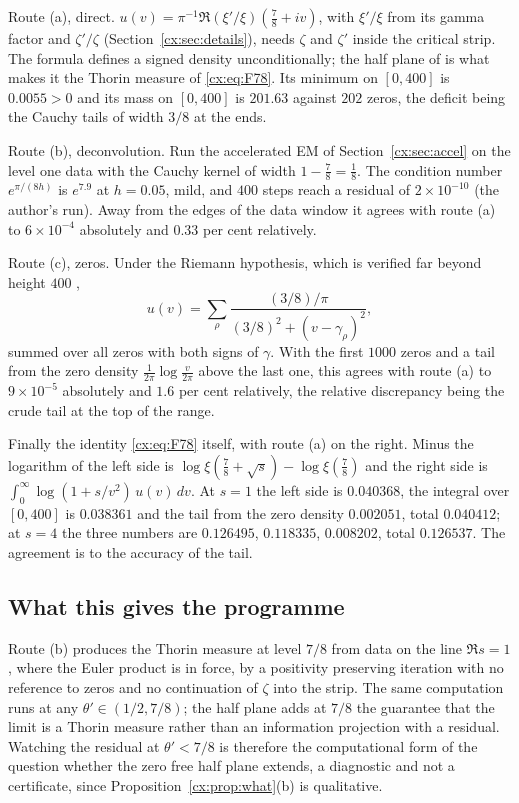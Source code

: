 Route (a), direct. $u(v)=\pi^{-1}\Re(\xi'/\xi)(\tfrac78+iv)$, with $\xi'/\xi$ from its gamma factor and $\zeta'/\zeta$ (Section~\ref{cx:sec:details}), needs $\zeta$ and $\zeta'$ inside the critical strip. The formula defines a signed density unconditionally; the half plane of \cite{OAI26a} is what makes it the Thorin measure of \eqref{cx:eq:F78}. Its minimum on $[0,400]$ is $0.0055>0$ and its mass on $[0,400]$ is $201.63$ against $202$ zeros, the deficit being the Cauchy tails of width $3/8$ at the ends.

Route (b), deconvolution. Run the accelerated EM of Section~\ref{cx:sec:accel} on the level one data with the Cauchy kernel of width $1-\tfrac78=\tfrac18$. The condition number $e^{\pi/(8h)}$ is $e^{7.9}$ at $h=0.05$, mild, and $400$ steps reach a residual of $2\times10^{-10}$ (the author's run). Away from the edges of the data window it agrees with route (a) to $6\times10^{-4}$ absolutely and $0.33$ per cent relatively.

Route (c), zeros. Under the Riemann hypothesis, which is verified far beyond height $400$ \cite{PT21},
\[
u(v)=\sum_\rho\frac{(3/8)/\pi}{(3/8)^2+(v-\gamma_\rho)^2},
\]
summed over all zeros with both signs of $\gamma$. With the first $1000$ zeros and a tail from the zero density $\frac1{2\pi}\log\frac v{2\pi}$ above the last one, this agrees with route (a) to $9\times10^{-5}$ absolutely and $1.6$ per cent relatively, the relative discrepancy being the crude tail at the top of the range.

Finally the identity \eqref{cx:eq:F78} itself, with route (a) on the right. Minus the logarithm of the left side is $\log\xi(\tfrac78+\sqrt s)-\log\xi(\tfrac78)$ and the right side is $\int_0^\infty\log(1+s/v^2)\,u(v)\,dv$. At $s=1$ the left side is $0.040368$, the integral over $[0,400]$ is $0.038361$ and the tail from the zero density $0.002051$, total $0.040412$; at $s=4$ the three numbers are $0.126495$, $0.118335$, $0.008202$, total $0.126537$. The agreement is to the accuracy of the tail.

\subsection{What this gives the programme}

Route (b) produces the Thorin measure at level $7/8$ from data on the line $\Re s=1$, where the Euler product is in force, by a positivity preserving iteration with no reference to zeros and no continuation of $\zeta$ into the strip. The same computation runs at any $\theta'\in(1/2,7/8)$; the half plane adds at $7/8$ the guarantee that the limit is a Thorin measure rather than an information projection with a residual. Watching the residual at $\theta'<7/8$ is therefore the computational form of the question whether the zero free half plane extends, a diagnostic and not a certificate, since Proposition~\ref{cx:prop:what}(b) is qualitative.

